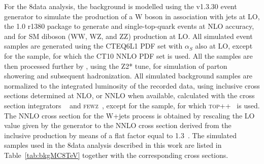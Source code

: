 For the 8\TeV data analysis, the background is modelled using the  v1.3.30 event generator to simulate the production of a W boson in association with jets at LO,
the \POWHEG{} 1.0 r1380 package to generate \ttbar and single-top-quark events at NLO accuracy, and  for SM diboson (WW, WZ, and ZZ) production at LO.
All simulated event samples are generated using the CTEQ6L1 PDF set with $\alpha_S$ also at LO, except for the \POWHEG{} \ttbar sample,
for which the CT10 NNLO PDF set is used.
All the samples are then processed further by , using the Z2* tune, for simulation of parton showering and subsequent hadronization. %
All simulated background samples are normalized to the integrated luminosity of the recorded data, using inclusive cross sections determined at NLO,
or NNLO when available, calculated with the cross section integrators \MCFM{}~\cite{Campbell:2003hd,Campbell:2011bn,Campbell:2012uf,Campbell:2004ch}
and \textsc{fewz}~\cite{Li:2012wna}, except for the \ttbar sample, for which \textsc{top++}~\cite{Czakon:2011xx} is used.
The NNLO cross section for the W+jets process is obtained by rescaling the LO value given by the generator to the NNLO cross section
derived from the inclusive production by means of a flat factor equal to 1.3~\cite{Binoth:2010nha}.
The simulated samples used in the 8\TeV data analysis described in this work are listed in Table~\ref{tab:bkgMC8TeV} together with the corresponding cross sections.\\

